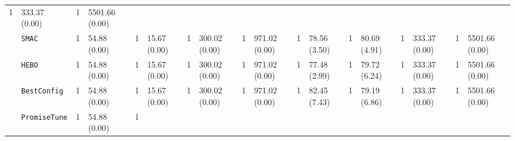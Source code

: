 \begin{tabular}{clllllllllllllllll}
  \cellcolor{blue!15}1 &
  \multicolumn{1}{l|}{\cellcolor{blue!15}333.37 (0.00)} &
  \cellcolor{blue!15}1 &
  \cellcolor{blue!15}5501.66 (0.00) \\
\multicolumn{1}{c|}{} &
  \multicolumn{1}{l|}{\texttt{SMAC}} &
  \cellcolor{blue!15}1 &
  \multicolumn{1}{l|}{\cellcolor{blue!15}54.88 (0.00)} &
  \cellcolor{blue!15}1 &
  \multicolumn{1}{l|}{\cellcolor{blue!15}15.67 (0.00)} &
  \cellcolor{blue!15}1 &
  \multicolumn{1}{l|}{\cellcolor{blue!15}300.02 (0.00)} &
  \cellcolor{blue!15}1 &
  \multicolumn{1}{l|}{\cellcolor{blue!15}971.02 (0.00)} &
  \cellcolor{blue!15}1 &
  \multicolumn{1}{l|}{\cellcolor{blue!15}78.56 (3.50)} &
  \cellcolor{blue!15}1 &
  \multicolumn{1}{l|}{\cellcolor{blue!15}80.69 (4.91)} &
  \cellcolor{blue!15}1 &
  \multicolumn{1}{l|}{\cellcolor{blue!15}333.37 (0.00)} &
  \cellcolor{blue!15}1 &
  \cellcolor{blue!15}5501.66 (0.00) \\
\multicolumn{1}{c|}{} &
  \multicolumn{1}{l|}{\texttt{HEBO}} &
  \cellcolor{blue!15}1 &
  \multicolumn{1}{l|}{\cellcolor{blue!15}54.88 (0.00)} &
  \cellcolor{blue!15}1 &
  \multicolumn{1}{l|}{\cellcolor{blue!15}15.67 (0.00)} &
  \cellcolor{blue!15}1 &
  \multicolumn{1}{l|}{\cellcolor{blue!15}300.02 (0.00)} &
  \cellcolor{blue!15}1 &
  \multicolumn{1}{l|}{\cellcolor{blue!15}971.02 (0.00)} &
  \cellcolor{blue!15}1 &
  \multicolumn{1}{l|}{\cellcolor{blue!15}77.48 (2.99)} &
  \cellcolor{blue!15}1 &
  \multicolumn{1}{l|}{\cellcolor{blue!15}79.72 (6.24)} &
  \cellcolor{blue!15}1 &
  \multicolumn{1}{l|}{\cellcolor{blue!15}333.37 (0.00)} &
  \cellcolor{blue!15}1 &
  \cellcolor{blue!15}5501.66 (0.00) \\
\multicolumn{1}{c|}{} &
  \multicolumn{1}{l|}{\texttt{BestConfig}} &
  \cellcolor{blue!15}1 &
  \multicolumn{1}{l|}{\cellcolor{blue!15}54.88 (0.00)} &
  \cellcolor{blue!15}1 &
  \multicolumn{1}{l|}{\cellcolor{blue!15}15.67 (0.00)} &
  \cellcolor{blue!15}1 &
  \multicolumn{1}{l|}{\cellcolor{blue!15}300.02 (0.00)} &
  \cellcolor{blue!15}1 &
  \multicolumn{1}{l|}{\cellcolor{blue!15}971.02 (0.00)} &
  \cellcolor{blue!15}1 &
  \multicolumn{1}{l|}{\cellcolor{blue!15}82.45 (7.43)} &
  \cellcolor{blue!15}1 &
  \multicolumn{1}{l|}{\cellcolor{blue!15}79.19 (6.86)} &
  \cellcolor{blue!15}1 &
  \multicolumn{1}{l|}{\cellcolor{blue!15}333.37 (0.00)} &
  \cellcolor{blue!15}1 &
  \cellcolor{blue!15}5501.66 (0.00) \\
\multicolumn{1}{c|}{} &
  \multicolumn{1}{l|}{\texttt{PromiseTune}} &
  \cellcolor{blue!15}1 &
  \multicolumn{1}{l|}{\cellcolor{blue!15}54.88 (0.00)} &
  \cellcolor{blue!15}1 &

\end{tabular}
